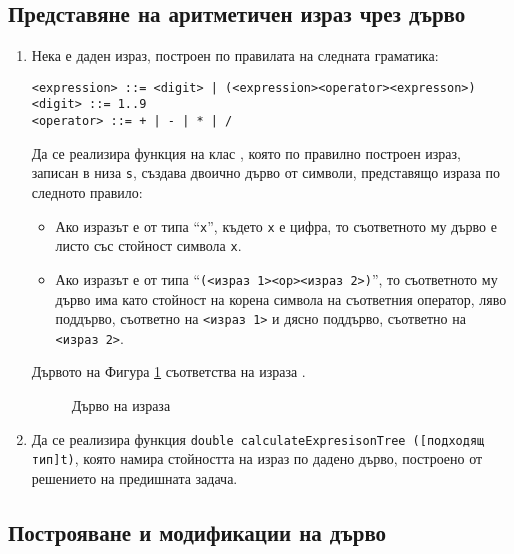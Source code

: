 \subsection {Представяне на аритметичен израз чрез дърво}
\begin{enumerate}[resume]
\item Нека е даден израз, построен по правилата на следната граматика:

\begin{verbatim}
<expression> ::= <digit> | (<expression><operator><expresson>)
<digit> ::= 1..9
<operator> ::= + | - | * | /
\end{verbatim}

Да се реализира функция на клас , която по правилно построен израз, записан в низа \texttt{s}, създава двоично дърво от символи, представящо израза по следното правило:
\begin{itemize}
  \item Ако изразът е от типа ``\texttt{x}'', където \texttt{x} е цифра, то съответното му дърво е листо със стойност символа \texttt{x}.
  \item Ако изразът е от типа ``\texttt{(<израз 1><op><израз 2>)}'', то съответното му дърво има като стойност на корена символа на съответния оператор, ляво поддърво, съответно на \texttt{<израз 1>} и дясно поддърво, съответно на \texttt{<израз 2>}.
\end{itemize}

Дървото на Фигура \ref{fig:treeexpr} съответства на израза .

\begin{figure}
\centering
{}
\caption{Дърво на израза }
\label{fig:treeexpr}
\end{figure}

\item Да се реализира функция \texttt{double calculateExpresisonTree ([подходящ тип]t)}, която намира стойността на израз по дадено дърво, построено от решението на предишната задача.

\end{enumerate}

\subsection {Построяване и модификации на дърво}

